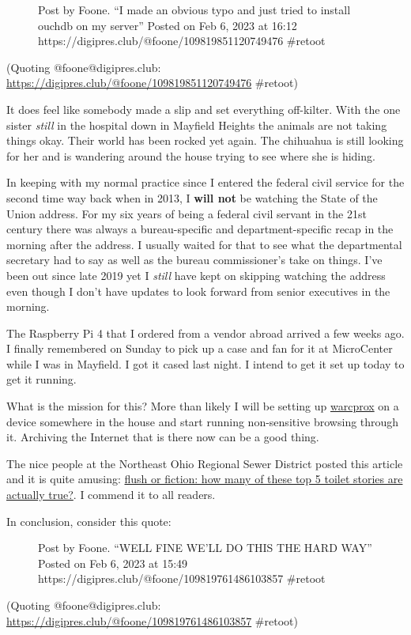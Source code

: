 \begin{figure}
\centering
{}
\caption{Post by Foone. ``I made an obvious typo and just tried to
install ouchdb on my server'' Posted on Feb 6, 2023 at 16:12
https://digipres.club/@foone/109819851120749476 \#retoot}
\end{figure}

(Quoting @foone@digipres.club:
\url{https://digipres.club/@foone/109819851120749476} \#retoot)

It does feel like somebody made a slip and set everything off-kilter.
With the one sister \emph{still} in the hospital down in Mayfield
Heights the animals are not taking things okay. Their world has been
rocked yet again. The chihuahua is still looking for her and is
wandering around the house trying to see where she is hiding.

In keeping with my normal practice since I entered the federal civil
service for the second time way back when in 2013, I \textbf{will not}
be watching the State of the Union address. For my six years of being a
federal civil servant in the 21st century there was always a
bureau-specific and department-specific recap in the morning after the
address. I usually waited for that to see what the departmental
secretary had to say as well as the bureau commissioner's take on
things. I've been out since late 2019 yet I \emph{still} have kept on
skipping watching the address even though I don't have updates to look
forward from senior executives in the morning.

The Raspberry Pi 4 that I ordered from a vendor abroad arrived a few
weeks ago. I finally remembered on Sunday to pick up a case and fan for
it at MicroCenter while I was in Mayfield. I got it cased last night. I
intend to get it set up today to get it running.

What is the mission for this? More than likely I will be setting up
\href{https://github.com/internetarchive/warcprox}{warcprox} on a device
somewhere in the house and start running non-sensitive browsing through
it. Archiving the Internet that is there now can be a good thing.

The nice people at the Northeast Ohio Regional Sewer District posted
this article and it is quite amusing:
\href{https://neorsd.substack.com/p/flush-or-fiction-how-many-of-these?r=2k3po&utm_medium=ios&utm_campaign=post}{flush
or fiction: how many of these top 5 toilet stories are actually true?}.
I commend it to all readers.

In conclusion, consider this quote:

\begin{figure}
\centering
{}
\caption{Post by Foone. ``WELL FINE WE'LL DO THIS THE HARD WAY'' Posted
on Feb 6, 2023 at 15:49 https://digipres.club/@foone/109819761486103857
\#retoot}
\end{figure}

(Quoting @foone@digipres.club:
\url{https://digipres.club/@foone/109819761486103857} \#retoot)
